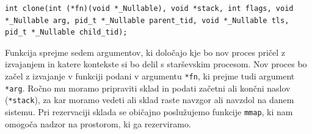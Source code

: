 \documentclass[a4paper,12pt,openright]{book}
\begin{document}
\begin{lstlisting}[style=func]
 int clone(int (*fn)(void *_Nullable), void *stack, int flags, void *_Nullable arg, pid_t *_Nullable parent_tid, void *_Nullable tls, pid_t *_Nullable child_tid);
\end{lstlisting}

Funkcija sprejme sedem argumentov, ki določajo kje bo nov proces pričel z izvajanjem in katere kontekste si bo delil s starševskim procesom.
Nov proces bo začel z izvajanje v funkciji podani v argumentu \texttt{*fn}, ki prejme tudi argument \texttt{*arg}.
Ročno mu moramo pripraviti sklad in podati začetni ali končni naslov (\texttt{*stack}), za kar moramo vedeti ali sklad raste navzgor ali navzdol na danem sistemu.
Pri rezervaciji sklada se običajno poslužujemo funkcije \texttt{mmap}, ki nam omogoča nadzor na prostorom, ki ga rezerviramo.
\end{document}
